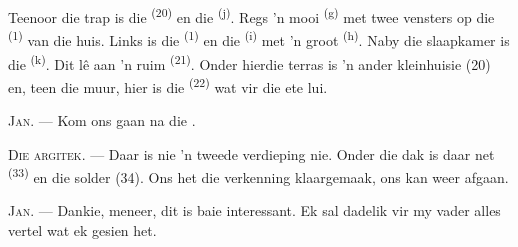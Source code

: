 \VUsaut{3.0mm}
\VUsaut{3.0mm}

Teenoor die trap is die  \textsuperscript{(20)} en die
 \textsuperscript{(j)}. Regs 'n mooi 
\textsuperscript{(g)} met twee vensters op die  \textsuperscript{(1)}
van die huis. Links is die  \textsuperscript{(1)} en die
 \textsuperscript{(i)} met 'n groot 
\textsuperscript{(h)}. Naby die slaapkamer is die 
\textsuperscript{(k)}. Dit lê aan 'n ruim  \textsuperscript{(21)}. Onder
hierdie terras is 'n ander kleinhuisie (20) en, teen die muur, hier is die
 \textsuperscript{(22)} wat vir die ete lui.

\textsc{Jan}. --- Kom ons gaan na die .

\textsc{Die argitek}. --- Daar is nie 'n tweede verdieping nie. Onder die dak is daar
net  \textsuperscript{(33)} en die solder (34). Ons het die
verkenning klaargemaak, ons kan weer afgaan.

\textsc{Jan}. --- Dankie, meneer, dit is baie interessant. Ek sal dadelik vir my vader
alles vertel wat ek gesien het.
\VUsaut{4.0mm}
\VUfilet{22mm}
